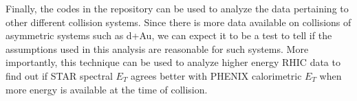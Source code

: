 Finally, the codes in the repository can be used to analyze the data pertaining to other different collision systems. Since there is more data available on collisions of asymmetric systems such as d+Au, we can expect it to be a test to tell if the assumptions used in this analysis are reasonable for such systems. More importantly, this technique can be used to analyze higher energy RHIC data to find out if STAR spectral $E_{T}$ agrees better with PHENIX calorimetric $E_{T}$ when more energy is available at the time of collision.

